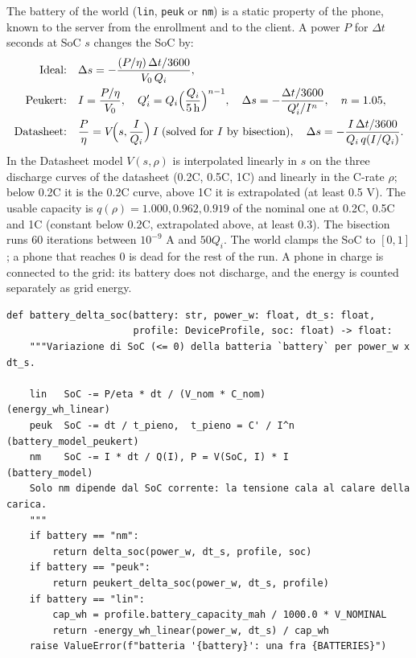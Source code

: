 \documentclass[11pt,a4paper]{article}
\newcommand{\cf}[1]{\texttt{#1}}
\begin{document}
The battery of the world (\cf{lin}, \cf{peuk} or \cf{nm}) is a static property
of the phone, known to the server from the enrollment and to the client. A
power $P$ for $\Delta t$ seconds at SoC $s$ changes the SoC by:
\begin{align}
  \text{Ideal:} \quad & \Delta s = -\frac{(P/\eta)\,\Delta t / 3600}{V_0 \, Q_i} , \\
  \text{Peukert:} \quad & I = \frac{P/\eta}{V_0}, \quad
      Q'_i = Q_i \Bigl(\frac{Q_i}{5\,\text{h}}\Bigr)^{n-1}, \quad
      \Delta s = -\frac{\Delta t / 3600}{Q'_i / I^{n}} , \quad n = 1.05 , \\
  \text{Datasheet:} \quad & \frac{P}{\eta} = V\!\Bigl(s, \frac{I}{Q_i}\Bigr) \, I
      \;\text{(solved for } I \text{ by bisection)}, \quad
      \Delta s = -\frac{I \, \Delta t / 3600}{Q_i \, q(I/Q_i)} .
\end{align}
In the Datasheet model $V(s, \rho)$ is interpolated linearly in $s$ on the three
discharge curves of the datasheet (0.2C, 0.5C, 1C) and linearly in the C-rate
$\rho$; below 0.2C it is the 0.2C curve, above 1C it is extrapolated (at least
0.5 V). The usable capacity is $q(\rho) = 1.000, 0.962, 0.919$ of the nominal
one at 0.2C, 0.5C and 1C (constant below 0.2C, extrapolated above, at least
0.3). The bisection runs 60 iterations between $10^{-9}$ A and $50 Q_i$. The
world clamps the SoC to $[0, 1]$; a phone that reaches 0 is dead for the rest
of the run. A phone in charge is connected to the grid: its battery does not
discharge, and the energy is counted separately as grid energy.

\begin{lstlisting}[style=py,firstnumber=71,caption={\texttt{tesifl/device/world\_state.py}, lines 71--87}]
def battery_delta_soc(battery: str, power_w: float, dt_s: float,
                      profile: DeviceProfile, soc: float) -> float:
    """Variazione di SoC (<= 0) della batteria `battery` per power_w x dt_s.

    lin   SoC -= P/eta * dt / (V_nom * C_nom)                (energy_wh_linear)
    peuk  SoC -= dt / t_pieno,  t_pieno = C' / I^n           (battery_model_peukert)
    nm    SoC -= I * dt / Q(I), P = V(SoC, I) * I            (battery_model)
    Solo nm dipende dal SoC corrente: la tensione cala al calare della carica.
    """
    if battery == "nm":
        return delta_soc(power_w, dt_s, profile, soc)
    if battery == "peuk":
        return peukert_delta_soc(power_w, dt_s, profile)
    if battery == "lin":
        cap_wh = profile.battery_capacity_mah / 1000.0 * V_NOMINAL
        return -energy_wh_linear(power_w, dt_s) / cap_wh
    raise ValueError(f"batteria '{battery}': una fra {BATTERIES}")
\end{lstlisting}
\end{document}
